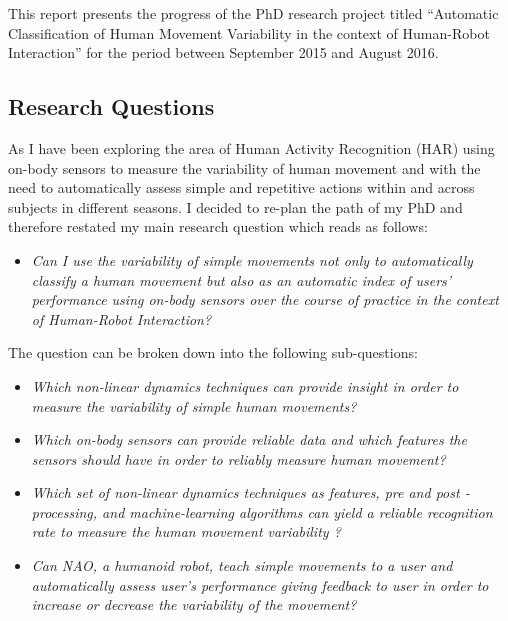 \documentclass[9pt,journal,onecolumn,compsoc]{IEEEtran}
\begin{document}


This report presents the progress of the PhD research project titled
``Automatic Classification of Human Movement Variability in the context of Human-Robot Interaction'' 
for the period between September 2015 and August 2016.


\subsection{Research Questions}
As 
I have been exploring the area of Human Activity Recognition (HAR)
using on-body sensors to measure the variability of human movement 
and 
with the need to automatically assess simple and repetitive actions 
within and across subjects in different seasons.
I decided to re-plan the path of my PhD and therefore restated my main research question which reads as follows:
\begin{itemize}
 \item \textit{Can I use the variability of simple movements not only to automatically classify
 a human movement but also as an automatic index of users' performance using on-body sensors 
over the course of practice in the context
of Human-Robot Interaction?}
\end{itemize}
The question can be broken down into the following sub-questions:
\begin{itemize}
 \item \textit{Which non-linear dynamics  techniques can provide insight in order to measure 
 the variability of simple human movements?}
 
 \item \textit{Which on-body sensors can provide reliable data 
 and which features the sensors should have in order to reliably measure human movement?}
 
 \item \textit{Which set of 
 non-linear dynamics techniques as features, 
 pre and post -processing, and machine-learning algorithms 
  can yield a reliable recognition rate to measure the human movement variability
  ?}
 
 \item \textit{Can NAO, a humanoid robot, 
 teach simple movements to a user and automatically assess user's performance 
 giving feedback to user in order to increase or decrease the variability of the movement?}
 
\end{itemize}
\end{document}

